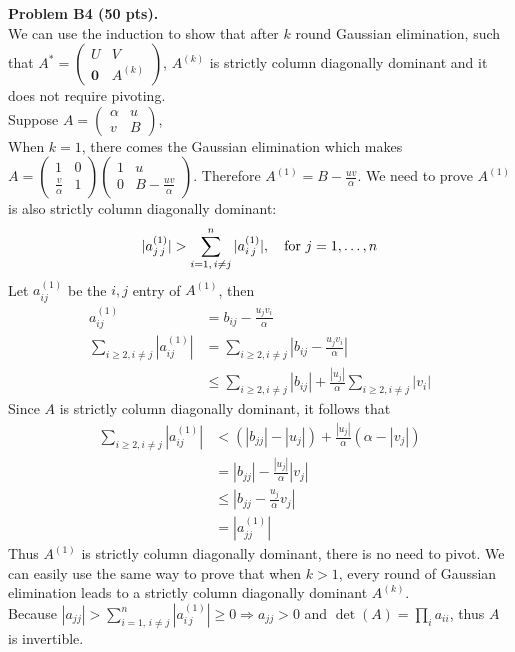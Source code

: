 \documentclass[12pt]{article}
\begin{document}
\vspace {0.25cm}\noindent
{\bf Problem B4 (50 pts).} \\
We can use the induction to show that after $k$ round Gaussian elimination, such that $ A^{*} = \begin{pmatrix}
U & V \\
\mathbf{0} & A^{(k)}
\end{pmatrix}
$, $A^{(k)}$ is strictly column diagonally dominant and it does not require pivoting.\\
Suppose $A = \begin{pmatrix}
\alpha & u \\
v & B
\end{pmatrix}$,\\
When $k = 1$, there comes the Gaussian elimination which makes $A = \begin{pmatrix}
1 & 0 \\
\frac{v}{\alpha} & 1
\end{pmatrix} 
\begin{pmatrix}
1 & u \\
0 & B - \frac{uv}{\alpha}
\end{pmatrix}$. Therefore $A^{(1)} = B - \frac{uv}{\alpha}$.
We need to prove  $A^{(1)}$ is also strictly column diagonally dominant:
\[
|a_{j\, j}^{(1)}| > \sum_{i = 1,\, i\not= j}^{n} |a_{i\, j}^{(1)}|,
\quad\hbox{for $j = 1, \ldots, n$}
\]
Let $a_{ij}^{(1)}$ be the $i,j$ entry of $A^{(1)}$, then \begin{align*}
a_{ij}^{(1)} &= b_{ij} - \frac{u_{j}v_{i}}{\alpha} \\
\sum_{i\geq 2, i\neq j}|a_{ij}^{(1)}| &= \sum_{i\geq 2, i\neq j}|b_{ij} - \frac{u_{j}v_{i}}{\alpha}| \\
&\leq 
\sum_{i\geq 2, i\neq j}|b_{ij}| + \frac{|u_j|}{\alpha}\sum_{i\geq 2, i\neq j} |v_i|
\end{align*}
Since $A$ is strictly column diagonally dominant, it follows that 
\begin{align*}
\sum_{i\geq 2, i\neq j}|a_{ij}^{(1)}| & <
(|b_{jj}| - |u_{j}|) + \frac{|u_j|}{\alpha} (\alpha - |v_{j}|) \\
&= |b_{jj}| - \frac{|u_j|}{\alpha}|v_j| \\
&\leq |b_{jj} - \frac{u_j}{\alpha}v_j| \\
&= |a_{jj}^{(1)}|
\end{align*}
Thus $A^{(1)}$ is strictly column diagonally dominant, there is no need to pivot.
We can easily use the same way to prove that when $k > 1$, every round of Gaussian elimination leads to a 
strictly column diagonally dominant $A^{(k)}$. \\
Because $|a_{jj}| > \sum_{i = 1,\, i\not= j}^{n} |a_{i\, j}^{(1)}| \geq 0 \Rightarrow a_{jj} > 0$ and $\det(A) = \prod_i a_{ii}$, thus $A$ is invertible. \\
\end{document}

